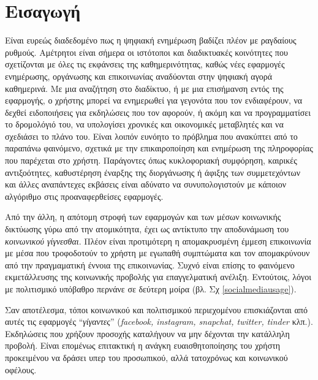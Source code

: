 \chapter{Εισαγωγή}
\label{chap1}

Είναι ευρεώς διαδεδομένο πως η ψηφιακή ενημέρωση βαδίζει πλέον με ραγδαίους ρυθμούς. Αμέτρητοι είναι σήμερα οι ιστότοποι και διαδικτυακές κοινότητες που σχετίζονται με όλες τις εκφάνσεις της καθημερινότητας, καθώς νέες εφαρμογές ενημέρωσης, οργάνωσης και επικοινωνίας αναδύονται στην ψηφιακή αγορά καθημερινά. Με μια αναζήτηση στο διαδίκτυο, ή με μια επισήμανση εντός της εφαρμογής, ο χρήστης μπορεί να ενημερωθεί για γεγονότα που τον ενδιαφέρουν, να δεχθεί ειδοποιήσεις για εκδηλώσεις που τον αφορούν, ή ακόμη και να προγραμματίσει το δρομολόγιό του, να υπολογίσει χρονικές και οικονομικές μεταβλητές και να σχεδιάσει το πλάνο του. Είναι λοιπόν ευνόητο το πρόβλημα που ανακύπτει από το παραπάνω φαινόμενο, σχετικά με την επικαιροποίηση και ενημέρωση της πληροφορίας που παρέχεται στο χρήστη. Παράγοντες όπως κυκλοφοριακή συμφόρηση, καιρικές αντιξοότητες, καθυστέρηση έναρξης της διοργάνωσης ή άφιξης των συμμετεχόντων και άλλες αναπάντεχες εκβάσεις είναι αδύνατο να συνυπολογιστούν με κάποιον αλγόριθμο στις προαναφερθείσες εφαρμογές.

Από την άλλη, η απότομη στροφή των εφαρμογών και των μέσων κοινωνικής δικτύωσης γύρω από την ατομικότητα, έχει ως αντίκτυπο την αποδυνάμωση του \textit{κοινωνικού γίγνεσθαι}. Πλέον είναι προτιμότερη η απομακρυσμένη έμμεση επικοινωνία με μέσα που τροφοδοτούν το χρήστη με εγωπαθή συμπτώματα και τον απομακρύνουν από την πραγμαματική έννοια της επικοινωνίας. Συχνό είναι επίσης το φαινόμενο εκμετάλλευσης της κοινωνικής προβολής για επαγγελματική ανέλιξη. Εντούτοις, λόγοι με πολιτισμικό υπόβαθρο περνάνε σε δεύτερη μοίρα (βλ. Σχ \ref{socialmediausage}). 

Σαν αποτέλεσμα, τόποι κοινωνικού και πολιτισμικού περιεχομένου επισκιάζονται από αυτές τις εφαρμογές ``\textit{γίγαντες}'' (\textit{facebook, instagram, snapchat, twitter, tinder} κλπ.). Εκδηλώσεις που χρήζουν προσοχής καταλήγουν να μην δέχονται την κατάλληλη προβολή. Είναι επομένως επιτακτική η ανάγκη ευαισθητοποίησης του χρήστη προκειμένου να δράσει υπερ του προσωπικού, αλλά τατοχρόνως και κοινωνικού οφέλους.   

